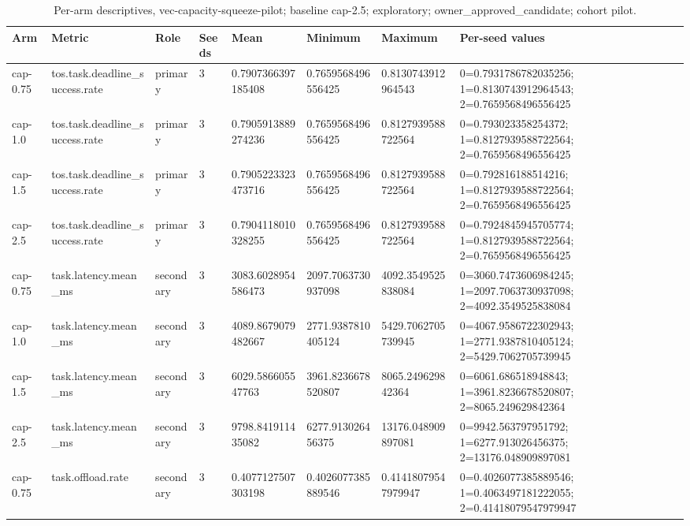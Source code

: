 {
\begin{table}[htbp]
\centering
\caption{Per-arm descriptives, vec-capacity-squeeze-pilot; baseline cap-2.5; exploratory; owner\_approved\_candidate; cohort pilot.}
\label{tab:traffictwin-metrics-ba4bf157fda1}
\small
\renewcommand{\arraystretch}{1.15}
\begin{tabular}{llllllll}
\hline
Arm & Metric & Role & Seeds & Mean & Minimum & Maximum & Per-seed values \\
\hline
cap-0.75 & tos.task.deadline\_success.rate & primary & 3 & 0.7907366397185408 & 0.7659568496556425 & 0.8130743912964543 & 0=0.7931786782035256; 1=0.8130743912964543; 2=0.7659568496556425 \\
cap-1.0 & tos.task.deadline\_success.rate & primary & 3 & 0.7905913889274236 & 0.7659568496556425 & 0.8127939588722564 & 0=0.793023358254372; 1=0.8127939588722564; 2=0.7659568496556425 \\
cap-1.5 & tos.task.deadline\_success.rate & primary & 3 & 0.7905223323473716 & 0.7659568496556425 & 0.8127939588722564 & 0=0.792816188514216; 1=0.8127939588722564; 2=0.7659568496556425 \\
cap-2.5 & tos.task.deadline\_success.rate & primary & 3 & 0.7904118010328255 & 0.7659568496556425 & 0.8127939588722564 & 0=0.7924845945705774; 1=0.8127939588722564; 2=0.7659568496556425 \\
cap-0.75 & task.latency.mean\_ms & secondary & 3 & 3083.6028954586473 & 2097.7063730937098 & 4092.3549525838084 & 0=3060.7473606984245; 1=2097.7063730937098; 2=4092.3549525838084 \\
cap-1.0 & task.latency.mean\_ms & secondary & 3 & 4089.8679079482667 & 2771.9387810405124 & 5429.7062705739945 & 0=4067.9586722302943; 1=2771.9387810405124; 2=5429.7062705739945 \\
cap-1.5 & task.latency.mean\_ms & secondary & 3 & 6029.586605547763 & 3961.8236678520807 & 8065.249629842364 & 0=6061.686518948843; 1=3961.8236678520807; 2=8065.249629842364 \\
cap-2.5 & task.latency.mean\_ms & secondary & 3 & 9798.841911435082 & 6277.913026456375 & 13176.048909897081 & 0=9942.563797951792; 1=6277.913026456375; 2=13176.048909897081 \\
cap-0.75 & task.offload.rate & secondary & 3 & 0.4077127507303198 & 0.4026077385889546 & 0.41418079547979947 & 0=0.4026077385889546; 1=0.4063497181222055; 2=0.41418079547979947 \\

\end{tabular}
\end{table}}

